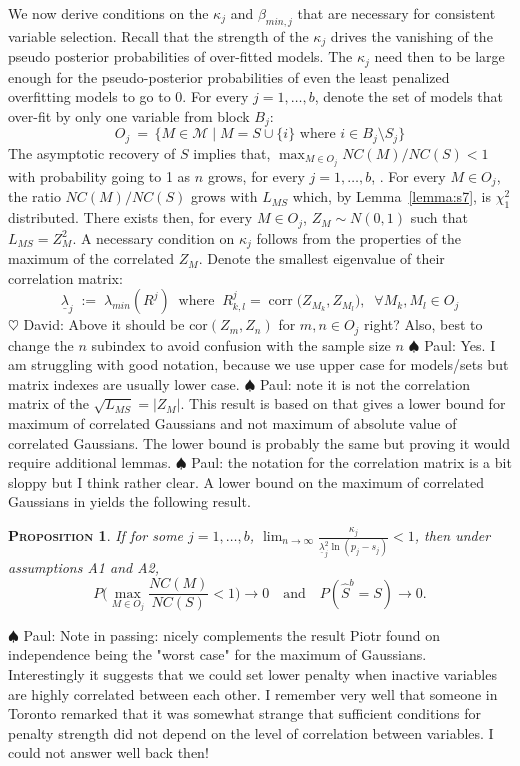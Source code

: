 \documentclass[aos]{imsart}
\theoremstyle{plain}
\newtheorem{prop}{\textsc{Proposition}}[section]
\newcommand{\david}[1]{{\small{\color{blue} \sf $\heartsuit$ David: #1}}}
\newcommand{\paul}[1]{{\small{\color{green} \sf $\spadesuit$ Paul: #1}}}
\begin{document}
We now derive conditions on the $\kappa_j$ and $\beta_{min,j}$ that are necessary for consistent variable selection. Recall that the strength of the $\kappa_j$ drives the vanishing of the pseudo posterior probabilities of over-fitted models. The $\kappa_j$ need then to be large enough for the pseudo-posterior probabilities of even the least penalized overfitting models to go to 0. For every $j=1,\ldots,b$, denote the set of models that over-fit by only one variable from block $B_j$:
$$O_j \:=\,\{M\in \mathcal{M}\;|\; M=S\cup\{i\} \text{ where } i\in B_j\setminus S_j\}$$
The asymptotic recovery of $S$ implies that, $\max_{M\in O_j}NC(M)/NC(S)<1$ with probability going to 1 as $n$ grows, for every $j=1,\ldots,b$, . For every $M\in O_j$, the ratio $NC(M)/NC(S)$ grows with $L_{MS}$ which, by Lemma~\ref{lemma:s7}, is $\chi^2_1$ distributed. There exists then, for every $M\in O_j$, $Z_M \sim N(0,1)$ such that $L_{MS}=Z_M^2$. A necessary condition on $\kappa_j$ follows from the properties of the maximum of the correlated $Z_M$. Denote the smallest eigenvalue of their correlation matrix:
\begin{equation}
    \underline{\lambda}_j\;:=\;\lambda_{min}(R^j)\;\;\text{where} \;\;R^j_{k,l}=\operatorname{corr}\big(Z_{M_k},Z_{M_l}\big),\;\;\forall M_k,M_l \in O_j
\end{equation}
\david{Above it should be $\mbox{cor}(Z_m,Z_n)$ for $m,n \in O_j$ right? Also, best to change the $n$ subindex to avoid confusion with the sample size $n$}\paul{Yes. I am struggling with good notation, because we use upper case for models/sets but matrix indexes are usually lower case.}
\paul{note it is not the correlation matrix of the $\sqrt{L_{MS}}=|Z_M|$. This result is based on \cite{hartigan} that gives a lower bound for maximum of correlated Gaussians and not maximum of absolute value of correlated Gaussians. The lower bound is probably the same but proving it would require additional lemmas.}
\paul{the notation for the correlation matrix is a bit sloppy but I think rather clear.}
A lower bound on the maximum of correlated Gaussians in \cite{hartigan} yields the following result.
\begin{prop}\label{prop:nectypeIreg}
     If for some $j=1,\ldots,b$,  $\lim_{n\to\infty}\frac{\kappa_j}{\underline{\lambda}_j^2\ln(p_j-s_j)} <1$, then under assumptions A1 and A2, $$P\Big(\max_{M\in O_j}\frac{NC(M)}{NC(S)}<1\Big)\to 0 \quad\text{and}\quad P(\hat{S}^b=S) \to 0.$$
\end{prop}

\paul{Note in passing: \cite{hartigan} nicely complements the result Piotr found on independence being the "worst case" for the maximum of Gaussians.\\
Interestingly it suggests that we could set lower penalty when inactive variables are highly correlated between each other. I remember very well that someone in Toronto remarked that it was somewhat strange that sufficient conditions for penalty strength did not depend on the level of correlation between variables. I could not answer well back then!}
\end{document}
